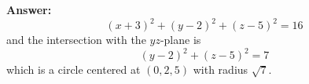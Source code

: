 \documentclass[a4paper,12pt,twocolumn]{article}
\newenvironment{solutionbox}{\begin{framed}}{\end{framed}}
\begin{document}
\begin{enumerate}[label=\textbf{\arabic*.}, leftmargin=2em, itemsep=1.2em]
\begin{solutionbox}
\medskip
\textbf{Answer:}
\[
\boxed{(x+3)^2+(y-2)^2+(z-5)^2=16}
\]
and the intersection with the \(yz\)-plane is
\[
\boxed{(y-2)^2+(z-5)^2=7}
\]
which is a circle centered at \((0,2,5)\) with radius \(\sqrt{7}\).
\end{solutionbox}

\end{enumerate}
\end{document}
